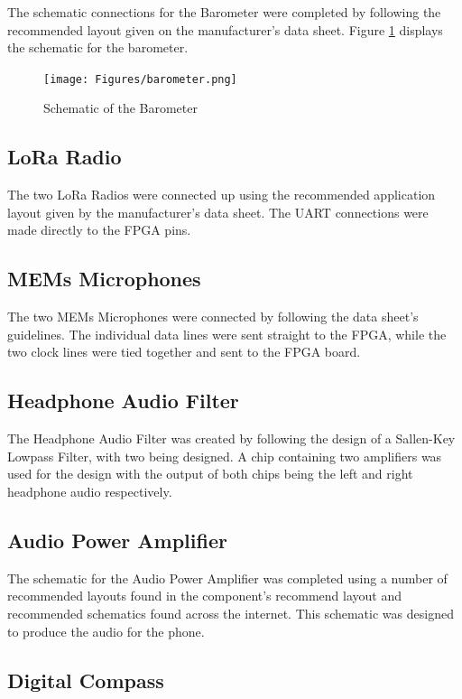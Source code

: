 	The schematic connections for the Barometer were completed by following the recommended layout given on the manufacturer's data sheet. 
Figure \ref{fig:barometer} displays the schematic for the barometer. 

\begin{figure}
	\texttt{[image: Figures/barometer.png]}\centering
	\caption{Schematic of the Barometer}
	\label{fig:barometer}
\end{figure}

\subsection{LoRa Radio}

	The two LoRa Radios were connected up using the recommended application layout given by the manufacturer's data sheet. The UART connections were made directly to the FPGA pins.

\subsection{MEMs Microphones}
\label{chap:mics}

	The two MEMs Microphones were connected by following the data sheet's guidelines. The individual data lines were sent straight to the FPGA, while the two clock lines were tied together and sent to the FPGA board. 

\subsection{Headphone Audio Filter} 
\label{chap:audio2}

	The Headphone Audio Filter was created by following the design of a Sallen-Key Lowpass Filter, with two being designed. A chip containing two amplifiers was used for the design with the output of both chips being the left and right headphone audio respectively. 

\subsection{Audio Power Amplifier}
\label{chap:audio}

	The schematic for the Audio Power Amplifier was completed using a number of recommended layouts found in the component's recommend layout and recommended schematics found across the internet. This schematic was designed to produce the audio for the phone. 

\subsection{Digital Compass}

